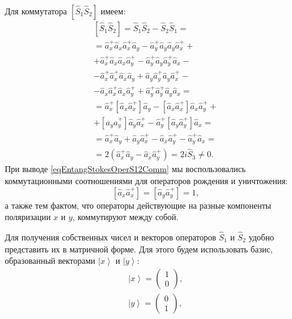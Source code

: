 Для коммутатора $\left[\hat{S}_1\hat{S}_2\right]$ имеем:
\begin{eqnarray}
\left[\hat{S}_1\hat{S}_2\right] = \hat{S}_1\hat{S}_2 -
\hat{S}_2\hat{S}_1 = 
\nonumber \\
=
\hat{a}_x^{+}\hat{a}_x\hat{a}_x^{+}\hat{a}_y -
\hat{a}_y^{+}\hat{a}_y\hat{a}_y\hat{a}_x^{+} + 
\nonumber \\
+ \hat{a}_x^{+}\hat{a}_x\hat{a}_x\hat{a}_y^{+} -
\hat{a}_y^{+}\hat{a}_y\hat{a}_y^{+}\hat{a}_x -
\nonumber \\
- \hat{a}_x^{+}\hat{a}_x^{+}\hat{a}_x\hat{a}_y +
\hat{a}_y\hat{a}_y^{+}\hat{a}_y\hat{a}_x^{+} -
\nonumber \\
- \hat{a}_x\hat{a}_x^{+}\hat{a}_x\hat{a}_y^{+} +
\hat{a}_y^{+}\hat{a}_y^{+}\hat{a}_y\hat{a}_x =
\nonumber \\
= \hat{a}_x^{+}\left[\hat{a}_x\hat{a}_x^{+}\right]\hat{a}_y -
\left[\hat{a}_x\hat{a}_x^{+}\right]\hat{a}_x\hat{a}_y^{+} +
\nonumber \\
+\left[\hat{a}_y\hat{a}_y^{+}\right]\hat{a}_y\hat{a}_x^{+} -
\hat{a}_y^{+}\left[\hat{a}_y\hat{a}_y^{+}\right]\hat{a}_x =
\nonumber \\
= \hat{a}_x^{+}\hat{a}_y + \hat{a}_y\hat{a}_x^{+} -
\hat{a}_x\hat{a}_y^{+} - \hat{a}_y^{+}\hat{a}_x = 
\nonumber \\
= 2 \left(\hat{a}_x^{+}\hat{a}_y - \hat{a}_x\hat{a}_y^{+}\right) = 2 i
\hat{S}_3 \ne 0.
\label{eqEntangStokesOperS12Comm}
\end{eqnarray}
При выводе \eqref{eqEntangStokesOperS12Comm} мы воспользовались
коммутационными соотношениями для операторов рождения и уничтожения:
\begin{equation}
\left[\hat{a}_x \hat{a}^{+}_x\right] = \left[\hat{a}_y \hat{a}^{+}_y\right] = 1,
\nonumber
\end{equation}
а также тем фактом, что операторы действующие на разные компоненты
поляризации $x$ и $y$, коммутируют между собой.

Для получения собственных чисел и векторов операторов $\hat{S}_1$ и
$\hat{S}_2$ удобно представить их в матричной форме. Для этого будем
использовать базис, образованный векторами $\left|x\right>$ и
$\left|y\right>$:
\begin{eqnarray}
\left|x\right> = \left(
\begin{array}{c}
1 \\
0
\end{array}
\right),
\nonumber \\
\left|y\right> = \left(
\begin{array}{c}
0 \\
1
\end{array}
\right),
\nonumber
\end{eqnarray}

